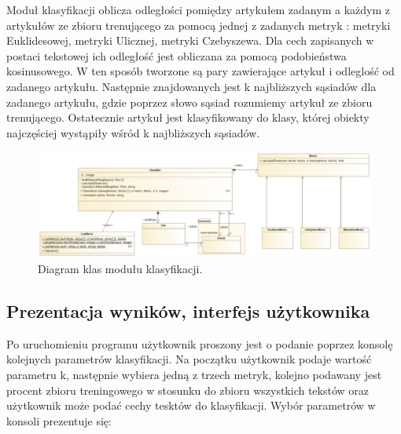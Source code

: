 \documentclass{classrep}
\begin{document}
Moduł klasyfikacji oblicza odległości pomiędzy artykułem zadanym a każdym z artykułów ze zbioru trenującego za pomocą jednej z zadanych metryk \cite{dane} : metryki Euklidesowej, metryki Ulicznej, metryki Czebyszewa. Dla cech zapisanych w postaci tekstowej ich odległość jest obliczana za pomocą podobieństwa kosinusowego. W ten sposób tworzone są pary zawierające artykuł i odleglość od zadanego artykułu. Następnie znajdowanych jest k najbliższych sąsiadów dla zadanego artykułu, gdzie poprzez słowo sąsiad rozumiemy artykuł ze zbioru trenującego. Ostatecznie artykuł jest klasyfikowany do klasy, której obiekty najczęściej wystąpiły wśród k najbliższych sąsiadów. 

\begin{figure}[h!]
 \centering
 \includegraphics[width=14cm]{Klasyfikator.png}
 \vspace{-0.3cm}
 \caption{Diagram klas modułu klasyfikacji. }
 \label{rysunek do eksperymentu 1 wariantu 1}
\end{figure}

\newpage

\subsection{Prezentacja wyników, interfejs użytkownika} 
Po uruchomieniu programu użytkownik proszony jest o podanie poprzez konsolę kolejnych parametrów klasyfikacji. Na początku użytkownik podaje wartość parametru k, następnie wybiera jedną z trzech metryk, kolejno podawany jest procent zbioru treningowego w stosunku do zbioru wszystkich tekstów oraz użytkownik może podać cechy tesktów do klasyfikacji. Wybór parametrów w konsoli prezentuje się:
\end{document}
